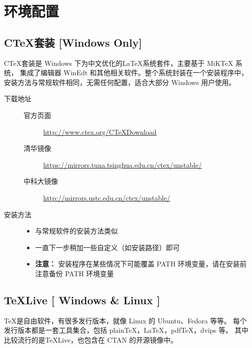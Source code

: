 \documentclass[master,openright,twoside,color,AutoFakeBold=true]{misc/buaathesis}
\begin{document}
  \mainmatter
  \pagestyle{mainmatter}
\fi

\chapter{环境配置}

\section{C\TeX{}套装 [Windows Only]}

C\TeX{}套装是 Windows 下为中文优化的\LaTeX{}系统套件，主要基于 MiKTeX 系统，
集成了编辑器 WinEdt 和其他相关软件。整个系统封装在一个安装程序中，
安装方法与常规软件相同，无需任何配置，适合大部分 Windows 用户使用。

\begin{description}
    \item[下载地址] \hfill
    \begin{description}
        \item[官方页面]
            \url{http://www.ctex.org/CTeXDownload}
        \item[清华镜像]
            \url{https://mirrors.tuna.tsinghua.edu.cn/ctex/unstable/}
        \item[中科大镜像]
            \url{http://mirrors.ustc.edu.cn/ctex/unstable/}
    \end{description}
    \item[安装方法] \hfill
        \begin{itemize}
            \item[] 与常规软件的安装方法类似
            \item[] 一直下一步稍加一些自定义（如安装路径）即可
            \item[] {\bf 注意：} 安装程序在某些情况下可能覆盖 PATH 环境变量，请在安装前注意备份 PATH 环境变量
        \end{itemize}
\end{description}

\section{\TeX{}Live [ Windows \& Linux ]}

\TeX{}是自由软件，有很多发行版本，就像 Linux 的 Ubuntu、Fedora 等等。
每个发行版本都是一套工具集合，包括 plain\TeX{}，\LaTeX{}，pdf\TeX{}，dvips 等。
其中比较流行的是\TeX{}Live，也包含在 CTAN 的开源镜像中。
\end{document}
